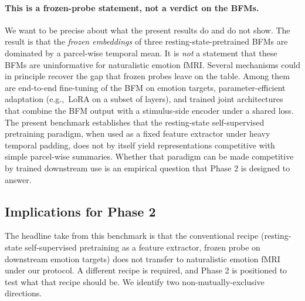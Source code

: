 \documentclass[11pt, a4paper]{article}
\newcommand{\eg}{e.g.,\ }
\begin{document}
\paragraph{This is a frozen-probe statement, not a verdict on the BFMs.}
We want to be precise about what the present results do and do not show. The result is
that the \emph{frozen embeddings} of three resting-state-pretrained BFMs are dominated by
a parcel-wise temporal mean. It is \emph{not} a statement that these BFMs are uninformative
for naturalistic emotion fMRI. Several mechanisms could in principle recover the gap that
frozen probes leave on the table. Among them are end-to-end fine-tuning of the BFM on
emotion targets, parameter-efficient adaptation (\eg LoRA on a subset of layers), and
trained joint architectures that combine the BFM output with a stimulus-side encoder
under a shared loss. The present benchmark establishes that the resting-state
self-supervised pretraining paradigm, when used as a fixed feature extractor under heavy
temporal padding, does not by itself yield representations competitive with simple
parcel-wise summaries. Whether that paradigm can be made competitive by trained downstream
use is an empirical question that Phase 2 is designed to answer.

\subsection{Implications for Phase 2}

The headline take from this benchmark is that the conventional recipe (resting-state
self-supervised pretraining as a feature extractor, frozen probe on downstream emotion
targets) does not transfer to naturalistic emotion fMRI under our protocol. A different
recipe is required, and Phase 2 is positioned to test what that recipe should be. We
identify two non-mutually-exclusive directions.
\end{document}
